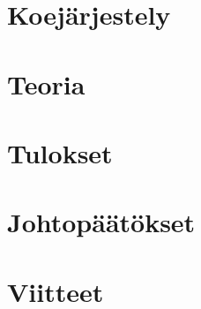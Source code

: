 \documentclass[a4paper, 12pt]{article}
\begin{document}
\section{Koejärjestely}

\section{Teoria}

\section{Tulokset}

\section{Johtopäätökset}

\section{Viitteet}
\end{document}
